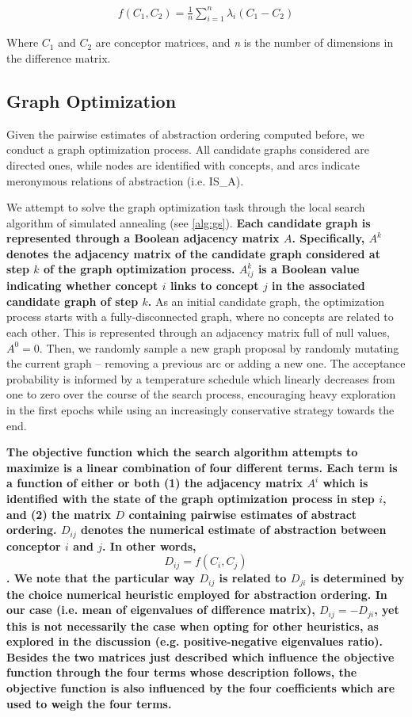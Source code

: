 \begin{align*}
    f(C_1, C_2) = \frac{1}{n} \sum\limits_{i=1}^n \lambda_i(C_1 - C_2)
\end{align*}

Where $C_1$ and $C_2$ are conceptor matrices, and \textit{n} is the number of dimensions in the difference matrix.

\subsection{Graph Optimization}

Given the pairwise estimates of abstraction ordering computed before, we conduct a graph optimization process. All candidate graphs considered are directed ones, while nodes are identified with concepts, and arcs indicate meronymous relations of abstraction (i.e. IS\_A).

We attempt to solve the graph optimization task through the local search algorithm of simulated annealing (see \ref{alg:gs}). \textbf{Each candidate graph is represented through a Boolean adjacency matrix $A$. Specifically, $A^k$ denotes the adjacency matrix of the candidate graph considered at step $k$ of the graph optimization process. $A^k_{ij}$ is a Boolean value indicating whether concept $i$ links to concept $j$ in the associated candidate graph of step $k$.} As an initial candidate graph, the optimization process starts with a fully-disconnected graph, where no concepts are related to each other. This is represented through an adjacency matrix full of null values, $A^0 = 0$. Then, we randomly sample a new graph proposal by randomly mutating the current graph -- removing a previous arc or adding a new one. The acceptance probability is informed by a temperature schedule which linearly decreases from one to zero over the course of the search process, encouraging heavy exploration in the first epochs while using an increasingly conservative strategy towards the end.

\textbf{The objective function which the search algorithm attempts to maximize is a linear combination of four different terms. Each term is a function of either or both (1) the adjacency matrix $A^i$ which is identified with the state of the graph optimization process in step $i$, and (2) the matrix $D$ containing pairwise estimates of abstract ordering. $D_{ij}$ denotes the numerical estimate of abstraction between conceptor $i$ and $j$. In other words, $$D_{ij} = f(C_i, C_j)$$. We note that the particular way $D_{ij}$ is related to $D_{ji}$ is determined by the choice numerical heuristic employed for abstraction ordering. In our case (i.e. mean of eigenvalues of difference matrix), $D_{ij} = -D_{ji}$, yet this is not necessarily the case when opting for other heuristics, as explored in the discussion (e.g. positive-negative eigenvalues ratio). Besides the two matrices just described which influence the objective function through the four terms whose description follows, the objective function is also influenced by the four coefficients which are used to weigh the four terms.}


